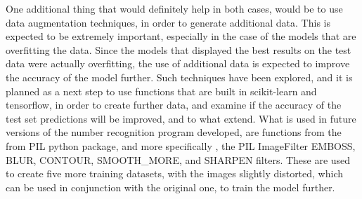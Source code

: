 \documentclass[final,12p,times]{elsarticle}
\begin{document}
One additional thing that would definitely help in both cases, would be to use data augmentation techniques, in order to generate additional data.
This is expected to be extremely important, especially in the case of the models that are overfitting the data.
Since the models that displayed the best results on the test data were actually overfitting, the use of additional data is expected 
to improve the accuracy of the model further.
Such techniques have been explored, and it is planned as a next step to use functions that are built in scikit-learn and tensorflow, in 
order to create further data, and examine if the accuracy of the test set predictions will be improved, and to what extend.
What is used in future versions of the number recognition program developed, are functions from the from PIL python package, 
and more specifically , the PIL ImageFilter EMBOSS, BLUR, CONTOUR, SMOOTH\_MORE, and SHARPEN filters.
These are used to create five more training datasets, with the images slightly distorted, which can be used in conjunction with 
the original one, to train the model further.



\clearpage



\end{document}
